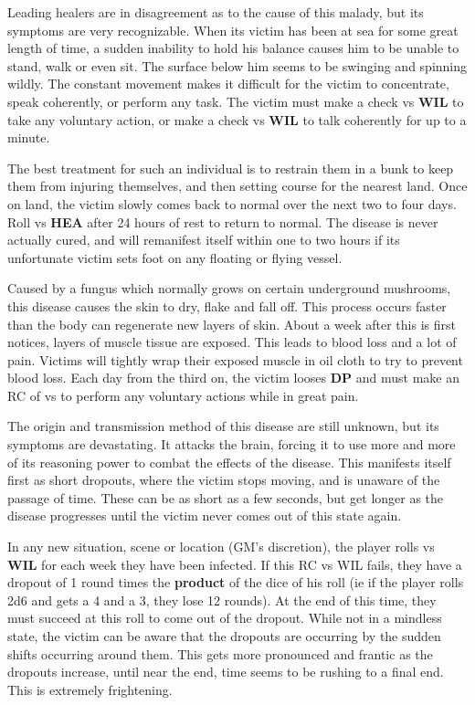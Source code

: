 \begin{multicols*}{2}
 Leading healers are in disagreement as to the cause of this malady, but its symptoms are very recognizable. When its victim has been at sea for some great length of time, a sudden inability to hold his balance causes him to be unable to stand, walk or even sit. The surface below him seems to be swinging and spinning wildly. The constant movement makes it difficult for the victim to concentrate, speak coherently, or perform any task. The victim must make a  check vs \textbf{WIL} to take any voluntary action, or make a  check vs \textbf{WIL} to talk coherently for up to a minute.

The best treatment for such an individual is to restrain them in a bunk to keep them from injuring themselves, and then setting course for the nearest land. Once on land, the victim slowly comes back to normal over the next two to four days. Roll  vs \textbf{HEA} after 24 hours of rest to return to normal. The disease is never actually cured, and will remanifest itself within one to two hours if its unfortunate victim sets foot on any floating or flying vessel.

 Caused by a fungus which normally grows on certain underground mushrooms, this disease causes the skin to dry, flake and fall off. This process occurs faster than the body can regenerate new layers of skin. About a week after this is first notices, layers of muscle tissue are exposed. This leads to blood loss and a lot of pain. Victims will tightly wrap their exposed muscle in oil cloth to try to prevent blood loss. Each day from the third on, the victim looses  \textbf{DP} and must make an RC of  vs  to perform any voluntary actions while in great pain.

 The origin and transmission method of this disease are still unknown, but its symptoms are devastating. It attacks the brain, forcing it to use more and more of its reasoning power to combat the effects of the disease. This manifests itself first as short dropouts, where the victim stops moving, and is unaware of the passage of time. These can be as short as a few seconds, but get longer as the disease progresses until the victim never comes out of this state again.

In any new situation, scene or location (GM's discretion), the player rolls  vs \textbf{WIL} for each week they have been infected. If this RC vs WIL fails, they have a dropout of 1 round times the \textbf{product} of the dice of his roll (ie if the player rolls 2d6 and gets a 4 and a 3, they lose 12 rounds). At the end of this time, they must succeed at this roll to come out of the dropout. While not in a mindless state, the victim can be aware that the dropouts are occurring by the sudden shifts occurring around them. This gets more pronounced and frantic as the dropouts increase, until near the end, time seems to be rushing to a final end. This is extremely frightening.


\end{multicols*}
